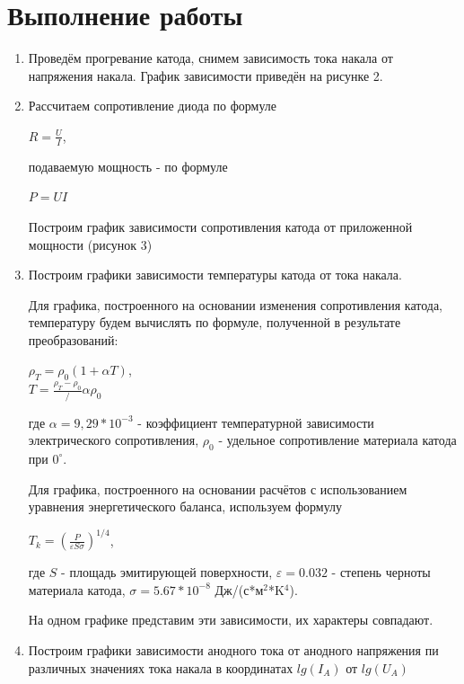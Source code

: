 \documentclass[a4paper]{article}
\begin{document}
\newpage
\section{Выполнение работы}
\begin{enumerate}
    \item Проведём прогревание катода, снимем зависимость тока накала от напряжения накала. График зависимости приведён на рисунке 2.
   
\item Рассчитаем сопротивление диода по формуле 
\begin{center}
    $R = \frac{U}{I}$,
\end{center}

подаваемую мощность - по формуле

\begin{center}
    $P = U I$
\end{center}

Построим график зависимости сопротивления катода от приложенной мощности (рисунок 3)



\item Построим графики зависимости температуры катода от тока накала.  \par
Для графика, построенного на основании изменения сопротивления катода, температуру будем вычислять по формуле, полученной в результате преобразований:
\begin{center}
   $ \rho_T = \rho_0 (1 + \alpha T) $, \\
   $T = \frac{\rho_T - \rho_0}/{\alpha \rho_0}$
\end{center}
где $\alpha = 9,29 * 10^{-3}$ - коэффициент температурной зависимости электрического сопротивления, $\rho_0$ - удельное сопротивление материала катода при $0^{\circ}$. \par

Для графика, построенного на основании расчётов с использованием уравнения энергетического баланса, используем формулу 
\begin{center}
    $T_k = (\frac{P}{\varepsilon S \sigma})^{1/4}$,
\end{center}
где $S$ - площадь эмитирующей поверхности, $\varepsilon = 0.032$ - степень черноты материала катода, $\sigma = 5.67*10^{-8}$ Дж/(с*м$^2$*K$^4$). \par
На одном графике представим эти зависимости, их характеры совпадают.



\item Построим графики зависимости анодного тока от анодного напряжения пи различных значениях тока накала в координатах $lg(I_A)$ от $lg(U_A)$




\end{enumerate}
\end{document}
